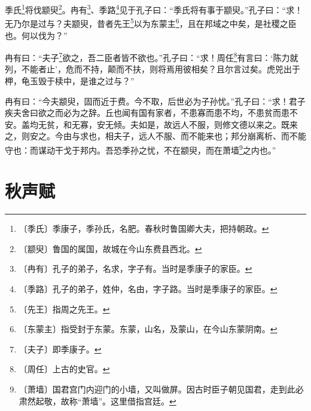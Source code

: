 \documentclass[12pt,UTF-8,openany]{ctexbook}
\begin{document}
\begin{normalsize}
    
    季氏\footnote{〔季氏〕季康子，季孙氏，名肥。春秋时鲁国卿大夫，把持朝政。}将伐颛臾\footnote{〔颛臾〕鲁国的属国，故城在今山东费县西北。}。冉有\footnote{〔冉有〕孔子的弟子，名求，字子有。当时是季康子的家臣。}、季路\footnote{〔季路〕孔子的弟子，姓仲，名由，字子路。当时是季康子的家臣。}见于孔子曰：“季氏将有事于颛臾。”孔子曰：“求！无乃尔是过与？夫颛臾，昔者先王\footnote{〔先王〕指周之先王。}以为东蒙主\footnote{〔东蒙主〕指受封于东蒙。东蒙，山名，及蒙山，在今山东蒙阴南。}，且在邦域之中矣，是社稷之臣也。何以伐为？”
    
    冉有曰：“夫子\footnote{〔夫子〕即季康子。}欲之，吾二臣者皆不欲也。”孔子曰：“求！周任\footnote{〔周任〕上古的史官。}有言曰：‘陈力就列，不能者止’，危而不持，颠而不扶，则将焉用彼相矣？且尔言过矣。虎兕出于柙，龟玉毁于椟中，是谁之过与？”
    
    冉有曰：“今夫颛臾，固而近于费。今不取，后世必为子孙忧。”孔子曰：“求！君子疾夫舍曰欲之而必为之辞。丘也闻有国有家者，不患寡而患不均，不患贫而患不安。盖均无贫，和无寡，安无倾。夫如是，故远人不服，则修文德以来之。既来之，则安之。今由与求也，相夫子，远人不服、而不能来也；邦分崩离析、而不能守也：而谋动干戈于邦内。吾恐季孙之忧，不在颛臾，而在萧墙\footnote{〔萧墙〕国君宫门内迎门的小墙，又叫做屏。因古时臣子朝见国君，走到此必肃然起敬，故称“萧墙”。这里借指宫廷。}之内也。”
\end{normalsize}



\chapter{秋声赋}
\end{document}
